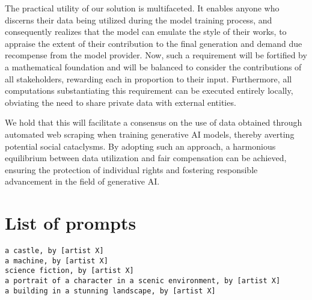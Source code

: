 \documentclass[12pt, letterpaper]{article}
\begin{document}
The practical utility of our solution is multifaceted. It enables anyone who discerns their data being utilized during the model training process, and consequently realizes that the model can emulate the style of their works, to appraise the extent of their contribution to the final generation and demand due recompense from the model provider. Now, such a requirement will be fortified by a mathematical foundation and will be balanced to consider the contributions of all stakeholders, rewarding each in proportion to their input. Furthermore, all computations substantiating this requirement can be executed entirely locally, obviating the need to share private data with external entities.

We hold that this will facilitate a consensus on the use of data obtained through automated web scraping when training generative AI models, thereby averting potential social cataclysms. By adopting such an approach, a harmonious equilibrium between data utilization and fair compensation can be achieved, ensuring the protection of individual rights and fostering responsible advancement in the field of generative AI.

\appendix
\section{List of prompts}
\label{app:example}

\begin{verbatim}
a castle, by [artist X]
a machine, by [artist X]
science fiction, by [artist X]
a portrait of a character in a scenic environment, by [artist X]
a building in a stunning landscape, by [artist X]
\end{verbatim}




\end{document}
